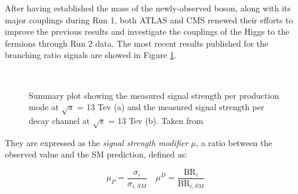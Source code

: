 After having established the mass of the newly-observed boson, along with its major couplings during Run 1, both ATLAS and CMS renewed their efforts to improve the previous results and investigate the couplings of the Higgs to the fermions through Run 2 data. The most recent results published for the branching ratio signals are showed in Figure \ref{fig:sigsm}.

\begin{figure}
    \myfloatalign
     \quad
     \\
    \caption[Signal strength modifiers]{Summary plot showing the measured signal strength per
    production mode at $\sqrt{s}$ = 13 Tev (a) and the measured signal
    strength per decay channel at $\sqrt{s}$ = 13 Tev (b). Taken from \cite{higgsrevcms}}\label{fig:sigsm}
\end{figure}

They are expressed as the \emph{signal strength modifier} $\mu$, a ratio between the observed value and  the SM prediction, defined as:

\[
\mu_P = \frac{\sigma_i}{\sigma_{i, SM}} \quad \mu^D = \frac{\text{BR}_i}{\text{BR}_{i, SM}}
\]

